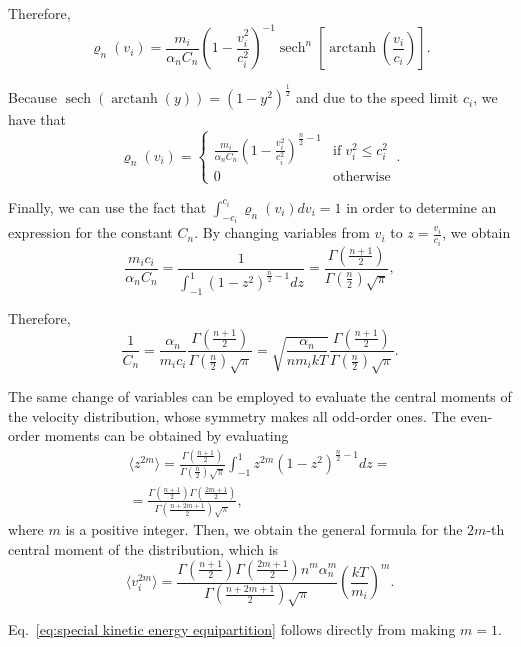 \documentclass[
aip,
jcp,
reprint,
]{revtex4-1}
\DeclareMathOperator\arctanh{arctanh}
\DeclareMathOperator\sech{sech}
\newcommand{\nn}{n}
\begin{document}
Therefore,
\begin{equation*}
\varrho_\nn(v_i) = \frac{m_i}{\alpha_\nn C_\nn} \left(1-\frac{v_i^2}{c_i^2}\right)^{-1} \sech^\nn\left[\arctanh\left(\frac{v_i}{c_i}\right)\right].
\end{equation*}

Because $\sech(\arctanh(y)) = (1-y^2)^\frac{1}{2}$ and due to the speed limit $c_i$, we have that
\begin{equation*}
\varrho_\nn(v_i) = \begin{cases}
\frac{m_i}{\alpha_\nn C_\nn} \left(1-\frac{v_i^2}{c_i^2}\right)^{\frac{\nn}{2}-1} & \mathrm{if} \; v_i^2 \leq c_i^2 \\
0 & \mathrm{otherwise}
\end{cases}.
\end{equation*}

Finally, we can use the fact that $\int_{-c_i}^{c_i} \varrho_\nn(v_i) dv_i = 1$ in order to determine an expression for the constant $C_\nn$.
By changing variables from $v_i$ to $z = \frac{v_i}{c_i}$, we obtain
\begin{equation*}
\frac{m_i c_i}{\alpha_\nn C_\nn} = \frac{1}{\int_{-1}^{1} (1-z^2)^{\frac{\nn}{2}-1} dz} = \frac{\Gamma\left(\frac{\nn+1}{2}\right)}{\Gamma\left(\frac{\nn}{2}\right) \sqrt{\pi}},
\end{equation*}

Therefore,
\begin{equation*}
\frac{1}{C_\nn} = \frac{\alpha_\nn}{m_i c_i} \frac{\Gamma\left(\frac{\nn+1}{2}\right)}{\Gamma\left(\frac{\nn}{2}\right) \sqrt{\pi}}
= \sqrt{\frac{\alpha_\nn}{\nn m_i k T}} \frac{\Gamma\left(\frac{\nn+1}{2}\right)}{\Gamma\left(\frac{\nn}{2}\right) \sqrt{\pi}}.
\end{equation*}

The same change of variables can be employed to evaluate the central moments of the velocity distribution, whose symmetry makes all odd-order ones.
The even-order moments can be obtained by evaluating
\begin{multline*}
\langle z^{2m} \rangle = \frac{\Gamma\left(\frac{\nn+1}{2}\right)}{\Gamma\left(\frac{\nn}{2}\right) \sqrt{\pi}} \int_{-1}^{1} z^{2m} (1-z^2)^{\frac{\nn}{2}-1} dz = \\
=\frac{\Gamma\left(\frac{\nn+1}{2}\right) \Gamma\left(\frac{2m + 1}{2}\right)}{\Gamma\left(\frac{\nn+2m+1}{2}\right) \sqrt{\pi}},
\end{multline*}
where $m$ is a positive integer.
Then, we obtain the general formula for the $2m$-th central moment of the distribution, which is
\begin{equation*}
\langle v_i^{2m} \rangle = \frac{\Gamma\left(\frac{\nn+1}{2}\right) \Gamma\left(\frac{2m + 1}{2}\right) \nn^m \alpha_\nn^m}{\Gamma\left(\frac{\nn+2m+1}{2}\right) \sqrt{\pi}}  \left(\frac{kT}{m_i}\right)^m.
\end{equation*}

Eq.~\eqref{eq:special kinetic energy equipartition} follows directly from making $m=1$.


\end{document}
